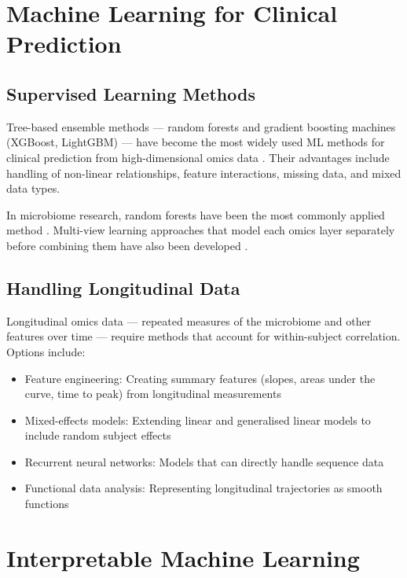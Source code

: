 \documentclass[12pt,a4paper]{report}
\begin{document}
\section{Machine Learning for Clinical Prediction}

\subsection{Supervised Learning Methods}

Tree-based ensemble methods --- random forests \cite{breiman2001} and gradient boosting machines (XGBoost, LightGBM) \cite{chen2016xgboost, ke2017lightgbm} --- have become the most widely used ML methods for clinical prediction from high-dimensional omics data \cite{statnikov2013comprehensive, pasolli2016machine}. Their advantages include handling of non-linear relationships, feature interactions, missing data, and mixed data types.

In microbiome research, random forests have been the most commonly applied method \cite{duvallet2017}. Multi-view learning approaches that model each omics layer separately before combining them have also been developed \cite{zhao2021}.

\subsection{Handling Longitudinal Data}

Longitudinal omics data --- repeated measures of the microbiome and other features over time --- require methods that account for within-subject correlation. Options include:
\begin{itemize}
    \item Feature engineering: Creating summary features (slopes, areas under the curve, time to peak) from longitudinal measurements
    \item Mixed-effects models: Extending linear and generalised linear models to include random subject effects \cite{diggle2002}
    \item Recurrent neural networks: Models that can directly handle sequence data \cite{esteva2019}
    \item Functional data analysis: Representing longitudinal trajectories as smooth functions \cite{ramsay2005}
\end{itemize}

\section{Interpretable Machine Learning}
\end{document}
